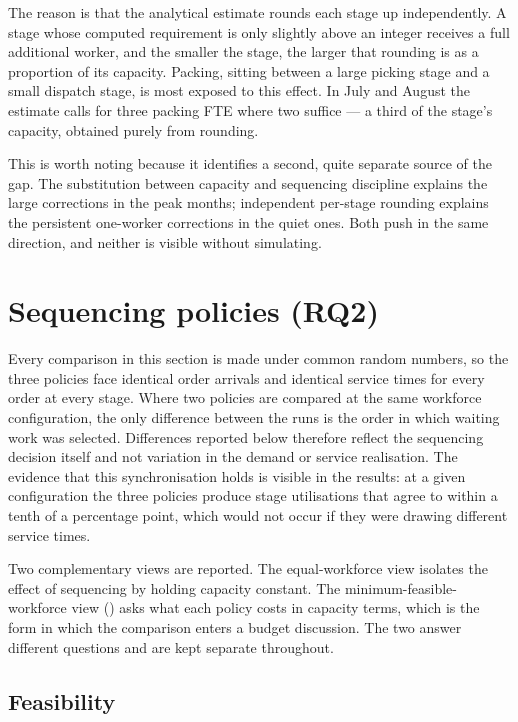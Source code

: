 The reason is that the analytical estimate rounds each stage up independently. A stage whose
computed requirement is only slightly above an integer receives a full additional worker, and
the smaller the stage, the larger that rounding is as a proportion of its capacity. Packing,
sitting between a large picking stage and a small dispatch stage, is most exposed to this
effect. In July and August the estimate calls for three packing FTE where two suffice --- a
third of the stage's capacity, obtained purely from rounding.

This is worth noting because it identifies a second, quite separate source of the gap. The
substitution between capacity and sequencing discipline explains the large corrections in the
peak months; independent per-stage rounding explains the persistent one-worker corrections in
the quiet ones. Both push in the same direction, and neither is visible without simulating.

\section{Sequencing policies (RQ2)}
\label{sec:res-policy}

Every comparison in this section is made under common random numbers, so the three policies face
identical order arrivals and identical service times for every order at every stage. Where two
policies are compared at the same workforce configuration, the only difference between the runs
is the order in which waiting work was selected. Differences reported below therefore reflect
the sequencing decision itself and not variation in the demand or service realisation. The
evidence that this synchronisation holds is visible in the results: at a given configuration the
three policies produce stage utilisations that agree to within a tenth of a percentage point,
which would not occur if they were drawing different service times.

Two complementary views are reported. The equal-workforce view isolates the effect of sequencing
by holding capacity constant. The minimum-feasible-workforce view
() asks what each policy costs in capacity terms, which is the form
in which the comparison enters a budget discussion. The two answer different questions and are
kept separate throughout.

\subsection{Feasibility}

